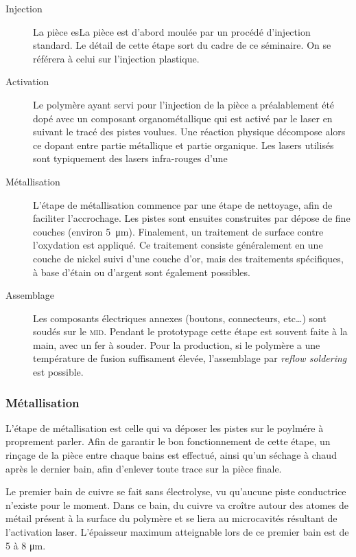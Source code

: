 \begin{description}
    \item[Injection] La pièce esLa pièce est d'abord moulée par un procédé
        d'injection standard. Le détail de cette étape sort du cadre de
        ce séminaire. On se référera à celui sur l'injection plastique. 
    \item[Activation] Le polymère ayant servi pour l'injection de la pièce a
        préalablement été
        dopé avec un composant organométallique qui est activé par le laser en
        suivant le tracé des pistes voulues. Une réaction physique décompose
        alors ce dopant entre partie métallique et partie organique.
        Les lasers utilisés sont typiquement des lasers infra-rouges d'une
    \item[Métallisation] L'étape de métallisation commence par une étape de
        nettoyage, afin de faciliter l'accrochage. Les pistes sont ensuites
        construites par dépose de fine couches (environ \SI{5}{\micro\meter}).
        Finalement, un traitement de surface contre l'oxydation est appliqué. Ce
        traitement consiste généralement en une couche de nickel suivi d'une
        couche d'or, mais des traitements spécifiques, à base d'étain ou
        d'argent sont également possibles.
    \item[Assemblage] Les composants électriques annexes (boutons, connecteurs,
        etc\ldots) sont soudés sur le \textsc{mid}. Pendant le prototypage cette
        étape est souvent faite à la main, avec un fer à souder. Pour la
        production, si le polymère a une température de fusion suffisament
        élevée, l'assemblage par \emph{reflow soldering} est possible. 
\end{description}

\subsubsection{Métallisation}
L'étape de métallisation est celle qui va déposer les pistes sur le poylmére à
proprement parler.
Afin de garantir le bon fonctionnement de cette étape, un rinçage de la pièce
entre chaque bains est effectué, ainsi qu'un séchage à chaud après le dernier
bain, afin d'enlever toute trace sur la pièce finale.

Le premier bain de cuivre se fait sans électrolyse, vu qu'aucune piste
conductrice n'existe pour le moment. Dans ce bain, du cuivre va croître autour
des atomes de métail présent à la surface du polymère et se liera au
microcavités résultant de l'activation laser. L'épaisseur maximum atteignable
lors de ce premier bain est de 5 à 8 \si{\micro\meter}.

